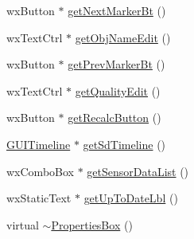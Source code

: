 \begin{DoxyCompactItemize}
\item 
wx\-Button $\ast$ \hyperlink{classPropertiesBox_a48eb0273411c2312509c20fd499cd068}{get\-Next\-Marker\-Bt} ()
\item 
wx\-Text\-Ctrl $\ast$ \hyperlink{classPropertiesBox_a012e6f4ebf8bf3443b72fff9c313aa3b}{get\-Obj\-Name\-Edit} ()
\item 
wx\-Button $\ast$ \hyperlink{classPropertiesBox_a4e97de926ac7efd390e166c5f17445c9}{get\-Prev\-Marker\-Bt} ()
\item 
wx\-Text\-Ctrl $\ast$ \hyperlink{classPropertiesBox_a7bad07488cb993a3eb6ec85763d2469b}{get\-Quality\-Edit} ()
\item 
wx\-Button $\ast$ \hyperlink{classPropertiesBox_a175c8202f9356211dbb9e3afced44347}{get\-Recalc\-Button} ()
\item 
\hyperlink{classGUITimeline}{G\-U\-I\-Timeline} $\ast$ \hyperlink{classPropertiesBox_a2f2f08b742f77e1d9adad98bc1d5753b}{get\-Sd\-Timeline} ()
\item 
wx\-Combo\-Box $\ast$ \hyperlink{classPropertiesBox_a9c3c000011a8b66faf5965b26d696776}{get\-Sensor\-Data\-List} ()
\item 
wx\-Static\-Text $\ast$ \hyperlink{classPropertiesBox_a5dadf68da6786bd09d4a882308e22e6f}{get\-Up\-To\-Date\-Lbl} ()
\item 
virtual \hyperlink{classPropertiesBox_a45688be94b4b06f34125aebf5004e617}{$\sim$\-Properties\-Box} ()
\end{DoxyCompactItemize}
